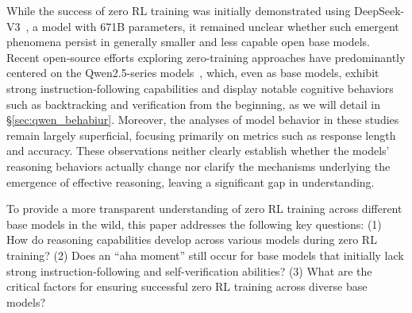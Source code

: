 While the success of zero RL training was initially demonstrated using DeepSeek-V3~\citep{deepseekai2025deepseekv3technicalreport}, a model with 671B parameters, it remained unclear whether such emergent phenomena persist in generally smaller and less capable open base models.
Recent open-source efforts exploring zero-training approaches have predominantly centered on the Qwen2.5-series models~\citep{zeng2025simplerl,yeo2025demystifying,xie2025logic,OpenReasonerZero2025,yu2025dapoopensourcellmreinforcement}, which, even as base models, exhibit strong instruction-following capabilities and display notable cognitive behaviors such as backtracking and verification from the beginning, as we will detail in \S\ref{sec:qwen_behabiur}.
Moreover, the analyses of model behavior in these studies remain largely superficial, focusing primarily on metrics such as response length and accuracy. These observations neither clearly establish whether the models' reasoning behaviors actually change nor clarify the mechanisms underlying the emergence of effective reasoning, leaving a significant gap in understanding.

To provide a more transparent understanding of zero RL training across different base models in the wild, this paper addresses the following key questions: (1) How do reasoning capabilities develop across various models during zero RL training? (2) Does an ``aha moment'' still occur for base models that initially lack strong instruction-following and self-verification abilities? (3) What are the critical factors for ensuring successful zero RL training across diverse base models?



